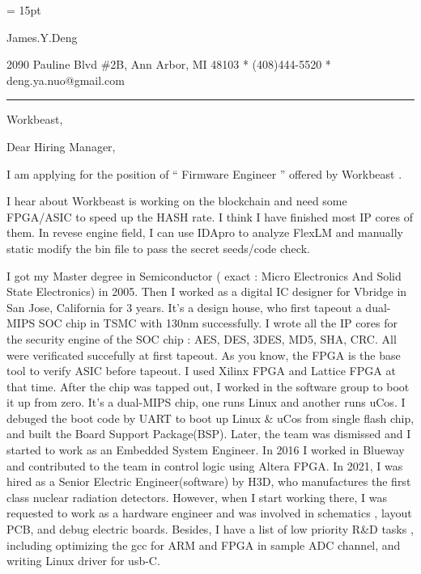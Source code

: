 

  \FFrg \baselineskip = 15pt

{
James.Y.Deng
}

{ 
2090 Pauline Blvd \#2B, Ann Arbor, MI 48103
*
(408)444-5520
*
deng.ya.nuo@gmail.com
}

{ \smallbreak } 

{\par\noindent\hrule} 

{ \bigbreak } 



Workbeast,


{ \bigbreak } 
{ 
Dear Hiring Manager,
}

{ \bigbreak } 
I am applying for the position of `` 
Firmware Engineer
'' offered by Workbeast .

{ \bigbreak } 
I hear about Workbeast is working on the blockchain and need some FPGA/ASIC to speed up the HASH rate.
I think I have finished most IP cores of them.
In revese engine field, 
I can use IDApro to analyze FlexLM and manually static modify the bin file to pass the secret seeds/code check. 

{ \bigbreak } 
I got my Master degree in Semiconductor ( exact : Micro Electronics And Solid State Electronics) in 2005.
Then I worked as a digital IC designer for Vbridge in San Jose, California for 3 years.
It's a design house, who first tapeout a dual-MIPS SOC chip in TSMC with 130nm successfully.
I wrote all the IP cores for the security engine of the SOC chip : AES, DES, 3DES, MD5, SHA, CRC.
All were verificated succefully at first tapeout.
As you know, the FPGA is the base tool to verify ASIC before tapeout.
I used Xilinx FPGA and Lattice FPGA at that time.
After the chip was tapped out, I worked in the software group to boot it up from zero.
It's a dual-MIPS chip, one runs Linux and another runs uCos.
I debuged the boot code by UART to boot up Linux \& uCos from single flash chip,
and built the Board Support Package(BSP).
Later, the team was dismissed and I started to work as an Embedded System Engineer.
In 2016 I worked in Blueway and contributed to the team in control logic using Altera FPGA.
In 2021, I was hired as a Senior Electric Engineer(software) by H3D, 
who manufactures the first class nuclear radiation detectors.
However, when I start working there, I was requested to work as
a hardware engineer and was involved in schematics , layout PCB, and debug electric boards.
Besides, I have a list of low priority R\&D tasks , 
including optimizing the gcc for ARM and FPGA in sample ADC channel,
and writing Linux driver for usb-C.

